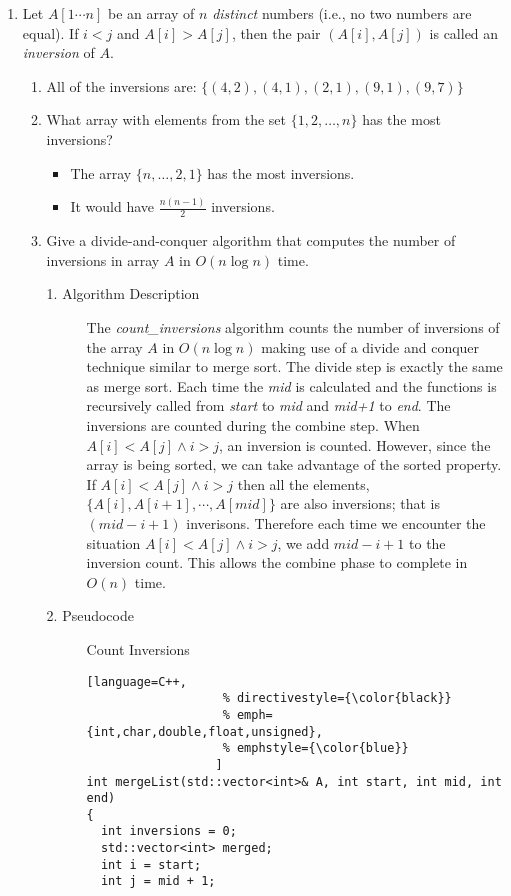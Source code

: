 \documentclass[11pt]{article}
\begin{document}
\begin{enumerate}
\item %
Let $A[1\cdots n]$ be an array of $n$ {\em distinct} numbers (i.e., no two
numbers are equal). If $i<j$ and $A[i]>A[j]$, then the pair
$(A[i],A[j])$ is called an {\em inversion} of $A$.

\begin{enumerate}
\item %
  All of the inversions are: $\{(4,2),(4,1),(2,1),(9,1),(9,7)\}$

\item %
  What array with elements from the set $\{1,2,\ldots,n\}$ has the most inversions?
  \begin{itemize}
    \item The array $\{n,\ldots,2,1\}$ has the most inversions.
    \item It would have $\frac{n(n-1)}{2}$ inversions.
  \end{itemize}

\item %
  Give a divide-and-conquer algorithm that computes the number of
  inversions in array $A$ in $O(n\log n)$ time.
\begin{description}
\item[1. Algorithm Description]

  The \textit{count\_inversions} algorithm counts the number of inversions of the array $A$ in $O(n\log{n})$ making use of a divide and conquer technique similar to merge sort. The divide step is exactly the same as merge sort. Each time the \textit{mid} is calculated and the functions is recursively called from \textit{start} to \textit{mid} and \textit{mid+1} to \textit{end}. The inversions are counted during the combine step. When $A[i] < A[j] \wedge i > j$, an inversion is counted. However, since the array is being sorted, we can take advantage of the sorted property. If $A[i] < A[j] \wedge i > j$ then all the elements, $\{A[i], A[i+1], \cdots, A[mid]\}$ are also inversions; that is $(mid - i + 1)$ inverisons. Therefore each time we encounter the situation $A[i] < A[j] \wedge i > j$, we add $mid - i + 1$ to the inversion count. This allows the combine phase to complete in $O(n)$ time.


\item[2. Pseudocode]
Count Inversions

\begin{lstlisting}[language=C++,
                   % directivestyle={\color{black}}
                   % emph={int,char,double,float,unsigned},
                   % emphstyle={\color{blue}}
                  ]
int mergeList(std::vector<int>& A, int start, int mid, int end)
{
  int inversions = 0;
  std::vector<int> merged;
  int i = start;
  int j = mid + 1;


\end{lstlisting}
\end{description}
\end{enumerate}
\end{enumerate}
\end{document}

